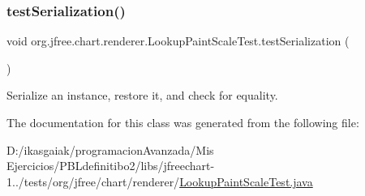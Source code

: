 \subsubsection{\texorpdfstring{test\+Serialization()}{testSerialization()}}
{\footnotesize\ttfamily void org.\+jfree.\+chart.\+renderer.\+Lookup\+Paint\+Scale\+Test.\+test\+Serialization (\begin{DoxyParamCaption}{ }\end{DoxyParamCaption})}

Serialize an instance, restore it, and check for equality. 

The documentation for this class was generated from the following file\+:\begin{DoxyCompactItemize}
\item 
D\+:/ikasgaiak/programacion\+Avanzada/\+Mis Ejercicios/\+P\+B\+Ldefinitibo2/libs/jfreechart-\/1../tests/org/jfree/chart/renderer/\mbox{\hyperlink{_lookup_paint_scale_test_8java}{Lookup\+Paint\+Scale\+Test.\+java}}\end{DoxyCompactItemize}
